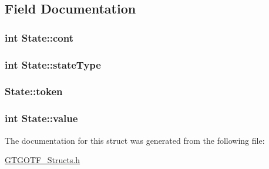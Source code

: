 \subsection{Field Documentation}
\hypertarget{structState_a59ce5ace1f042871476d027578373a10}{
\subsubsection[{cont}]{\setlength{\rightskip}{0pt plus 5cm}int State\-::cont}}\label{structState_a59ce5ace1f042871476d027578373a10}
\hypertarget{structState_a815c7d082e4ffdd1a5cb6be3bdea0742}{
\subsubsection[{state\-Type}]{\setlength{\rightskip}{0pt plus 5cm}int State\-::state\-Type}}\label{structState_a815c7d082e4ffdd1a5cb6be3bdea0742}
\hypertarget{structState_ac8fa30ee49b7ea41e7abafea82dead9b}{
\subsubsection[{token}]{ State\-::token}}\label{structState_ac8fa30ee49b7ea41e7abafea82dead9b}
\hypertarget{structState_ad005ebc45314033c4b897401ee150d13}{
\subsubsection[{value}]{\setlength{\rightskip}{0pt plus 5cm}int State\-::value}}\label{structState_ad005ebc45314033c4b897401ee150d13}


The documentation for this struct was generated from the following file\-:\begin{DoxyCompactItemize}
\item 
\hyperlink{GTGOTF__Structs_8h}{G\-T\-G\-O\-T\-F\-\_\-\-Structs.\-h}\end{DoxyCompactItemize}
